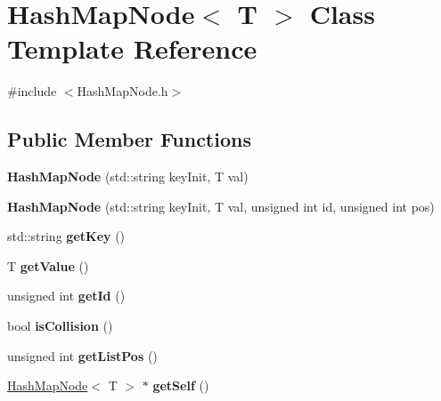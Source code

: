 \hypertarget{class_hash_map_node}{}\section{Hash\+Map\+Node$<$ T $>$ Class Template Reference}
\label{class_hash_map_node}


{\ttfamily \#include $<$Hash\+Map\+Node.\+h$>$}

\subsection*{Public Member Functions}
\begin{DoxyCompactItemize}
\item 
\mbox{\label{class_hash_map_node_a4cfb7cf18b2ca41357310326b577504c}} 
{\bfseries Hash\+Map\+Node} (std\+::string key\+Init, T val)
\item 
\mbox{\label{class_hash_map_node_a69e5bd9dd0fa24b4cc87b6c072c315ee}} 
{\bfseries Hash\+Map\+Node} (std\+::string key\+Init, T val, unsigned int id, unsigned int pos)
\item 
\mbox{\label{class_hash_map_node_ad6463320fe646898360fb61f1bfc04ac}} 
std\+::string {\bfseries get\+Key} ()
\item 
\mbox{\label{class_hash_map_node_a8855969959e0e16cc0b2f65a959c6d70}} 
T {\bfseries get\+Value} ()
\item 
\mbox{\label{class_hash_map_node_ab92ff60fdc29aabebfd552d5e64398b4}} 
unsigned int {\bfseries get\+Id} ()
\item 
\mbox{\label{class_hash_map_node_ae6ffed502bab42df7468f20ec8eec64a}} 
bool {\bfseries is\+Collision} ()
\item 
\mbox{\label{class_hash_map_node_aa55f1c8f1687e3970f8d58f0b4a723c3}} 
unsigned int {\bfseries get\+List\+Pos} ()
\item 
\mbox{\label{class_hash_map_node_aca720bc83d4adc0cda49d68246319f25}} 
\hyperlink{class_hash_map_node}{Hash\+Map\+Node}$<$ T $>$ $\ast$ {\bfseries get\+Self} ()

\end{DoxyCompactItemize}
